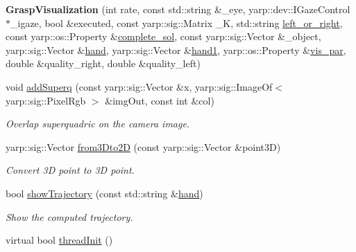 \begin{DoxyCompactItemize}
\item 
{\bfseries Grasp\+Visualization} (int rate, const std\+::string \&\+\_\+eye, yarp\+::dev\+::\+I\+Gaze\+Control $\ast$\+\_\+igaze, bool \&executed, const yarp\+::sig\+::\+Matrix \+\_\+K, std\+::string \hyperlink{classGraspVisualization_ac960abe59ca5c92521d9cb9f01dc6370}{left\+\_\+or\+\_\+right}, const yarp\+::os\+::\+Property \&\hyperlink{classGraspVisualization_a542f3bc536b354d12256f2c95fcadab1}{complete\+\_\+sol}, const yarp\+::sig\+::\+Vector \&\+\_\+object, yarp\+::sig\+::\+Vector \&\hyperlink{classGraspVisualization_af6ecf326ddb626e2dd7f83e8d75d12eb}{hand}, yarp\+::sig\+::\+Vector \&\hyperlink{classGraspVisualization_a23c0f2f9e30b20ff6ec38e0fe119ab39}{hand1}, yarp\+::os\+::\+Property \&\hyperlink{classGraspVisualization_a0efcb3e2545e09b7480da109ceaa4533}{vis\+\_\+par}, double \&quality\+\_\+right, double \&quality\+\_\+left)\label{classGraspVisualization_a33db96015b6d831cbd12d3c2279ec161}

\item 
void \hyperlink{classGraspVisualization_a0069fc0b6752a254d09d5f5f7f72dba8}{add\+Superq} (const yarp\+::sig\+::\+Vector \&x, yarp\+::sig\+::\+Image\+Of$<$ yarp\+::sig\+::\+Pixel\+Rgb $>$ \&img\+Out, const int \&col)
\begin{DoxyCompactList}\small\item\em Overlap superquadric on the camera image. \end{DoxyCompactList}\item 
yarp\+::sig\+::\+Vector \hyperlink{classGraspVisualization_a7217275a38ec798541bd68a84618bda6}{from3\+Dto2D} (const yarp\+::sig\+::\+Vector \&point3D)
\begin{DoxyCompactList}\small\item\em Convert 3D point to 3D point. \end{DoxyCompactList}\item 
bool \hyperlink{classGraspVisualization_a3ada3605a942fb51696e9747fed52a72}{show\+Trajectory} (const std\+::string \&\hyperlink{classGraspVisualization_af6ecf326ddb626e2dd7f83e8d75d12eb}{hand})
\begin{DoxyCompactList}\small\item\em Show the computed trajectory. \end{DoxyCompactList}\item 
virtual bool \hyperlink{classGraspVisualization_a277232b1b99ecc061242abee8175ff16}{thread\+Init} ()\label{classGraspVisualization_a277232b1b99ecc061242abee8175ff16}


\end{DoxyCompactItemize}
